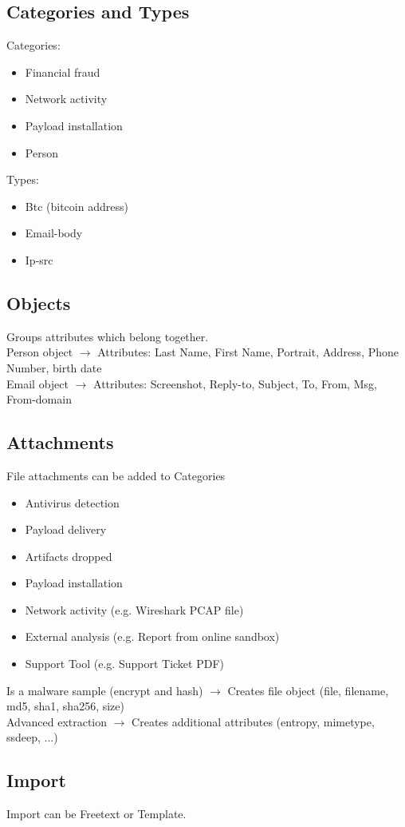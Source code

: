 \subsection{Categories and Types}
Categories:
\begin{itemize}
    \item Financial fraud
    \item Network activity
    \item Payload installation
    \item Person
\end{itemize}
Types:
\begin{itemize}
    \item Btc (bitcoin address)
    \item Email-body
    \item Ip-src  
\end{itemize}
\subsection{Objects}
Groups attributes which belong together.\\
Person object $\rightarrow$ Attributes: Last Name, First Name, Portrait, Address, Phone Number, birth date\\
Email object $\rightarrow$ Attributes: Screenshot, Reply-to, Subject, To, From, Msg, From-domain
\subsection{Attachments}
File attachments can be added to Categories
\begin{itemize}
    \item Antivirus detection
    \item Payload delivery
    \item Artifacts dropped
    \item Payload installation
    \item Network activity (e.g. Wireshark PCAP file)
    \item External analysis (e.g. Report from online sandbox)
    \item Support Tool (e.g. Support Ticket PDF)
\end{itemize}
Is a malware sample (encrypt and hash) $\rightarrow$ Creates file object (file, filename, md5, sha1, sha256, size)\\
Advanced extraction $\rightarrow$ Creates additional attributes (entropy, mimetype, ssdeep, ...)

\subsection{Import}
Import can be Freetext or Template.

